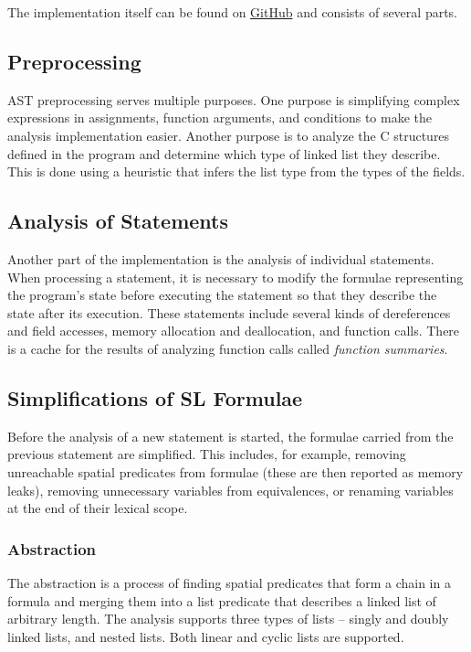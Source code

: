 \documentclass{ExcelAtFIT}
\begin{document}
The implementation itself can be found on \href{https://github.com/pepega007xd/slplugin}{GitHub} and consists of several parts. 

\subsection{Preprocessing}
AST preprocessing serves multiple purposes. One purpose is simplifying complex expressions in assignments, function arguments, and conditions to make the analysis implementation easier. Another purpose is to analyze the C structures defined in the program and determine which type of linked list they describe. This is done using a heuristic that infers the list type from the types of the fields.

\subsection{Analysis of Statements} 
Another part of the implementation is the analysis of individual statements. When processing a statement, it is necessary to modify the formulae representing the program's state before executing the statement so that they describe the state after its execution. These statements include several kinds of dereferences and field accesses, memory allocation and deallocation, and function calls. There is a cache for the results of analyzing function calls called \textit{function summaries}. 

\subsection{Simplifications of SL Formulae}
Before the analysis of a new statement is started, the formulae carried from the previous statement are simplified. This includes, for example, removing unreachable spatial predicates from formulae (these are then reported as memory leaks), removing unnecessary variables from equivalences, or renaming variables at the end of their lexical scope.

\subsubsection{Abstraction}
The abstraction is a process of finding spatial predicates that form a chain in a formula and merging them into a list predicate that describes a linked list of arbitrary length. The analysis supports three types of lists -- singly and doubly linked lists, and nested lists. Both linear and cyclic lists are supported.
\end{document}
